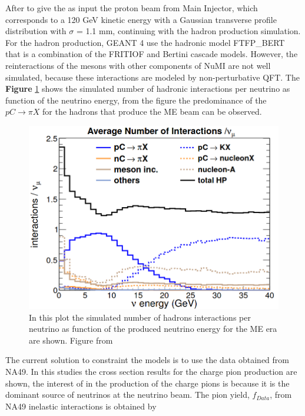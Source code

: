 After to give the as input the proton beam from Main Injector, which corresponds to a 120 GeV kinetic energy with a Gaussian transverse profile distribution with $\sigma$ = 1.1 mm, continuing with the hadron production simulation. For the hadron production, GEANT 4 use the hadronic model FTFP\_BERT that is a combination of the FRITIOF \cite{PhysRevD.90.032001} and Bertini \cite{BERTINI1971670} \cite{GUTHRIE196829}cascade models. However, the reinteractions of the mesons with other components of NuMI are not well simulated, because these interactions are modeled by non-perturbative QFT. The \textbf{Figure} \ref{fig:Simulation:Beam:HadIntperNu} shows the simulated number of hadronic interactions per neutrino as function of the neutrino energy, from the figure the predominance of the $pC\rightarrow\pi X$ for the hadrons that produce the ME beam can be observed. 

\begin{figure}[!htb]
    \centering
    \includegraphics[scale=0.3]{Figures/Chapter3/HadronicInteractions.png}
    \caption{In this plot the simulated number of hadrons interactions per neutrino as function of the produced neutrino energy for the ME era are shown. Figure from \cite{LeoThesis}}
    \label{fig:Simulation:Beam:HadIntperNu}
\end{figure}

The current solution to constraint the models is to use the data obtained from NA49\cite{NA49}. In this studies \cite{NA49} the cross section results for the charge pion production are shown, the interest of in the production of the charge pions is because it is the dominant source of neutrinos at the neutrino beam. The pion yield, $f_{Data}$, from NA49 inelastic interactions is obtained by


